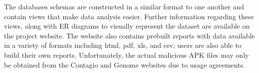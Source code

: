 \documentclass{sig-alternate}
\newif\ifisnopii
\begin{document}
The databases schemas are constructed in a similar format to one another and contain views that make data analysis easier. Further information regarding these views, along with ER diagrams to visually represent the dataset are available on the project website. The website also contains prebuilt reports with data available in a variety of formats including html, pdf, xls, and csv; users are also able to build their own reports. Unfortunately, the actual malicious APK files may only be obtained from the Contagio and Genome websites due to usage agreements.

















\end{document}
